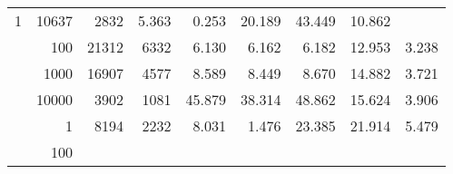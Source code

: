 \begin{table}
\begin{tabular}{rrrrrrrrr}
					
					 
					\multirow{ 1 }{*}{ 1 } &
					
						
							    
							     10637  & 2832  
	                           & 5.363 & 0.253 & 20.189
	                           & 43.449 & 10.862  \\
	                
	            
					 &  
					 
					\multirow{ 1 }{*}{ 100 } &
					
						
							    
							     21312  & 6332  
	                           & 6.130 & 6.162 & 6.182
	                           & 12.953 & 3.238  \\
	                
	            
					 &  
					 
					\multirow{ 1 }{*}{ 1000 } &
					
						
							    
							     16907  & 4577  
	                           & 8.589 & 8.449 & 8.670
	                           & 14.882 & 3.721  \\
	                
	            
					 &  
					 
					\multirow{ 1 }{*}{ 10000 } &
					
						
							    
							     3902  & 1081  
	                           & 45.879 & 38.314 & 48.862
	                           & 15.624 & 3.906  \\
	                
	            
	        
				\noalign{\smallskip}\hline
				\multirow{ 4 }{*}{ 2000000 } &
				
					
					 
					\multirow{ 1 }{*}{ 1 } &
					
						
							    
							     8194  & 2232  
	                           & 8.031 & 1.476 & 23.385
	                           & 21.914 & 5.479  \\
	                
	            
					 &  
					 
					\multirow{ 1 }{*}{ 100 } &
					
						
							    

\end{tabular}
\end{table}

